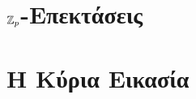 \documentclass{report}
\begin{document}




\chapter{$\mathbb{Z}_p$-Επεκτάσεις}







\chapter{Η Κύρια Εικασία }




%
\end{document}
